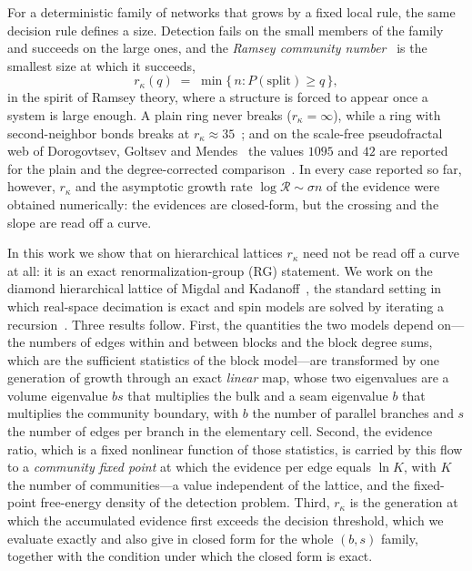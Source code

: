 \documentclass[preprint,12pt]{elsarticle}
\newcommand{\Rev}{\mathcal{R}}
\newcommand{\logR}{\log \Rev}
\newcommand{\rk}{r_{\kappa}}
\begin{document}
For a deterministic family of networks that grows by a fixed local rule, the
same decision rule defines a size. Detection fails on the small members of the
family and succeeds on the large ones, and the \emph{Ramsey community
number}~\cite{d7kf-s1cf} is the smallest size at which it succeeds,
\begin{equation}
  \rk(q) \;=\; \min\{\, n : P(\text{split})\ge q \,\},
  \label{eq:rk}
\end{equation}
in the spirit of Ramsey theory, where a structure is forced to appear once a
system is large enough. A plain ring never breaks ($\rk=\infty$), while a ring
with second-neighbor bonds breaks at
$\rk\approx35$~\cite{vazquez2026ringwantsbroken}; and on the scale-free
pseudofractal web of Dorogovtsev, Goltsev and Mendes~\cite{dgm2002} the values
$1095$ and $42$ are reported for the plain and the degree-corrected
comparison~\cite{karrer2011,vazquez2026communitystructurepseudofractalweb}. In every case reported so far,
however, $\rk$ and the asymptotic growth rate $\logR\sim\sigma n$ of the
evidence were obtained numerically: the evidences are closed-form, but the
crossing and the slope are read off a curve.

In this work we show that on hierarchical lattices $\rk$ need not be read off a
curve at all: it is an exact renormalization-group (RG) statement. We work on
the diamond hierarchical lattice of Migdal and
Kadanoff~\cite{migdal1976,kadanoff1976}, the standard setting in which real-space
decimation is exact and spin models are solved by iterating a
recursion~\cite{berker1979,kaufman1981,griffiths1982}. Three results follow.
First, the quantities the two models depend on---the numbers of edges within
and between blocks and the block degree sums, which are the sufficient
statistics of the block model---are transformed by one generation of growth
through an exact \emph{linear} map, whose two eigenvalues are a volume
eigenvalue $bs$ that multiplies the bulk and a seam eigenvalue $b$ that
multiplies the community boundary, with $b$ the number of parallel branches and
$s$ the number of edges per branch in the elementary cell. Second, the evidence
ratio, which is a fixed nonlinear function of those statistics, is carried by
this flow to a \emph{community fixed point} at which the evidence per edge
equals $\ln K$, with $K$ the number of communities---a value independent of the
lattice, and the fixed-point free-energy density of the detection problem.
Third, $\rk$ is the generation at which the accumulated evidence first exceeds
the decision threshold, which we evaluate exactly and also give in closed form
for the whole $(b,s)$ family, together with the condition under which the
closed form is exact.
\end{document}
